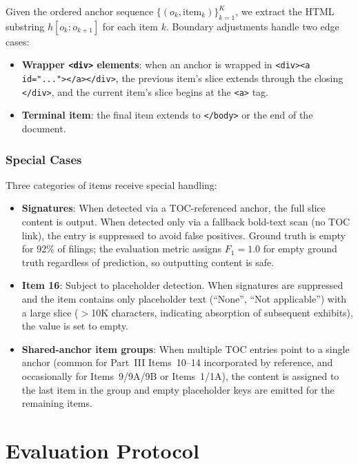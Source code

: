 \documentclass[12pt,letterpaper,oneside]{article}
\begin{document}
Given the ordered anchor sequence $\{(o_k, \text{item}_k)\}_{k=1}^{K}$,
we extract the HTML substring $h[o_k : o_{k+1}]$ for each item $k$.
Boundary adjustments handle two edge cases:
\begin{itemize}
  \item \textbf{Wrapper \texttt{<div>} elements}: when an anchor is
    wrapped in \texttt{<div><a id="...">\allowbreak</a></div>}, the
    previous item's slice extends through the closing \texttt{</div>},
    and the current item's slice begins at the \texttt{<a>} tag.
  \item \textbf{Terminal item}: the final item extends to
    \texttt{</body>} or the end of the document.
\end{itemize}

\subsubsection{Special Cases}

Three categories of items receive special handling:

\begin{itemize}
  \item \textbf{Signatures}: When detected via a TOC-referenced
    anchor, the full slice content is output. When detected only via
    a fallback bold-text scan (no TOC link), the entry is suppressed
    to avoid false positives. Ground truth is empty for 92\% of
    filings; the evaluation metric assigns $F_1 = 1.0$ for empty
    ground truth regardless of prediction, so outputting content is
    safe.

  \item \textbf{Item 16}: Subject to placeholder detection. When
    signatures are suppressed and the item contains only placeholder
    text (``None'', ``Not applicable'') with a large slice ($>$10K
    characters, indicating absorption of subsequent exhibits), the
    value is set to empty.

  \item \textbf{Shared-anchor item groups}: When multiple TOC
    entries point to a single anchor (common for Part~III Items~10--14
    incorporated by reference, and occasionally for Items~9/9A/9B or
    Items~1/1A), the content is assigned to the last item in the
    group and empty placeholder keys are emitted for the remaining
    items.
\end{itemize}


\section{Evaluation Protocol}\label{sec:eval}
\end{document}
